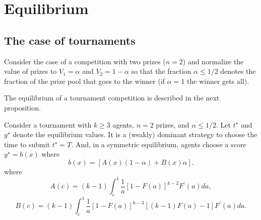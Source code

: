\documentclass[11pt]{article}
\begin{document}
\section{Equilibrium}
\subsection{The case of tournaments}

Consider the case of a competition with two prizes ($n=2$) and normalize the value of prizes to $V_1=\alpha$ and $V_2=1-\alpha$ so that the fraction $\alpha\leq 1/2$ denotes the fraction of the prize pool that goes to the winner (if $\alpha=1$ the winner gets all). 

The equilibrium of a tournament competition is described in the next proposition.

\begin{proposition}
Consider a tournament with $k\geq3$ agents, $n=2$ prizes, and $\alpha\leq 1/2$. Let $t^\star$ and $y^\star$ denote the equilibrium values.  It is a (weakly) dominant strategy to choose the time to submit $t^\star=T$. And, in a symmetric equilibrium, agents choose a score $y^\star=b(x)$ where 
\begin{equation}
  b(x) = [A(x) (1-\alpha) + B(x)\alpha]. 
\end{equation} 
where 
\begin{equation}
  A(c) = (k-1) \int_c^1 \frac{1}{a} [1-F(a)]^{k-2} F^\prime(a) da, 
\end{equation}
\begin{equation}
  B(c) = (k-1) \int_c^1 \frac{1}{a} [1-F(a)]^{k-3} [(k-1)F(a) - 1] F^\prime(a) da. 
\end{equation}
\end{proposition}
\end{document}
